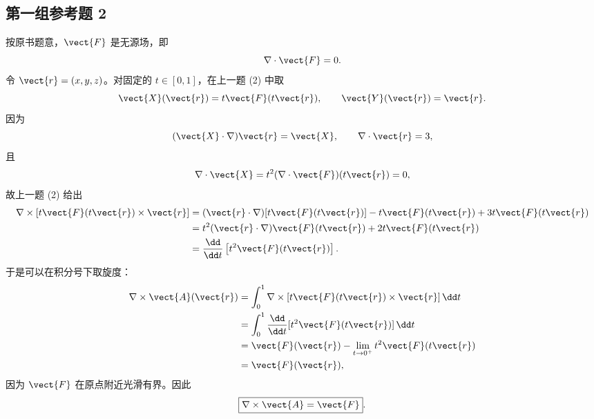 \subsection*{第一组参考题 2}
\begin{xsolution}
按原书题意，$\vect{F}$ 是无源场，即
\[
  \nabla\cdot\vect{F}=0.
\]
令 $\vect{r}=(x,y,z)$。对固定的 $t\in[0,1]$，在上一题 (2) 中取
\[
  \vect{X}(\vect{r})=t\vect{F}(t\vect{r}),
  \qquad
  \vect{Y}(\vect{r})=\vect{r}.
\]
因为
\[
  (\vect{X}\cdot\nabla)\vect{r}=\vect{X},
  \qquad
  \nabla\cdot\vect{r}=3,
\]
且
\[
  \nabla\cdot\vect{X}
  =t^2(\nabla\cdot\vect{F})(t\vect{r})=0,
\]
故上一题 (2) 给出
\begin{align*}
  \nabla\times[t\vect{F}(t\vect{r})\times\vect{r}]
  &=(\vect{r}\cdot\nabla)[t\vect{F}(t\vect{r})]
    -t\vect{F}(t\vect{r})+3t\vect{F}(t\vect{r})\\
  &=t^2(\vect{r}\cdot\nabla)\vect{F}(t\vect{r})
    +2t\vect{F}(t\vect{r})\\
  &=\frac{\dd}{\dd t}\left[t^2\vect{F}(t\vect{r})\right].
\end{align*}
于是可以在积分号下取旋度：
\begin{align*}
  \nabla\times\vect{A}(\vect{r})
  &=\int_0^1
    \nabla\times[t\vect{F}(t\vect{r})\times\vect{r}]\,\dd t\\
  &=\int_0^1\frac{\dd}{\dd t}
    [t^2\vect{F}(t\vect{r})]\,\dd t\\
  &=\vect{F}(\vect{r})-\lim_{t\to0^+}t^2\vect{F}(t\vect{r})\\
  &=\vect{F}(\vect{r}),
\end{align*}
因为 $\vect{F}$ 在原点附近光滑有界。因此
\[
  \boxed{\nabla\times\vect{A}=\vect{F}}.
\]
\end{xsolution}


